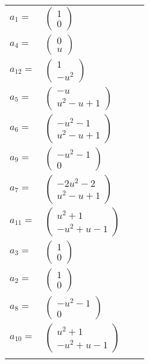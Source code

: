 \documentclass[1p]{elsarticle_modified}
\theoremstyle{definition}
\begin{document}
\begin{tabular}{m{7pt} m{180pt} m{7pt} m{180pt} }
\flushright $a_{1}=$&$\begin{pmatrix}1\\0\end{pmatrix}$ \\
\flushright $a_{4}=$&$\begin{pmatrix}0\\u\end{pmatrix}$ \\
\flushright $a_{12}=$&$\begin{pmatrix}1\\- u^2\end{pmatrix}$ \\
\flushright $a_{5}=$&$\begin{pmatrix}- u\\u^2- u+1\end{pmatrix}$ \\
\flushright $a_{6}=$&$\begin{pmatrix}- u^2-1\\u^2- u+1\end{pmatrix}$ \\
\flushright $a_{9}=$&$\begin{pmatrix}- u^2-1\\0\end{pmatrix}$ \\
\flushright $a_{7}=$&$\begin{pmatrix}-2 u^2-2\\u^2- u+1\end{pmatrix}$ \\
\flushright $a_{11}=$&$\begin{pmatrix}u^2+1\\- u^2+u-1\end{pmatrix}$ \\
\flushright $a_{3}=$&$\begin{pmatrix}1\\0\end{pmatrix}$ \\
\flushright $a_{2}=$&$\begin{pmatrix}1\\0\end{pmatrix}$ \\
\flushright $a_{8}=$&$\begin{pmatrix}- u^2-1\\0\end{pmatrix}$ \\
\flushright $a_{10}=$&$\begin{pmatrix}u^2+1\\- u^2+u-1\end{pmatrix}$\\&\end{tabular}
\end{document}
